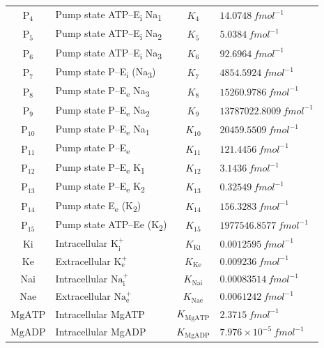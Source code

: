 \documentclass[fleqn,10pt]{physiome}
\begin{document}
\begin{table}[H]
\begin{tabular}{cl c l}
		$\text{P}_4$ & Pump state ATP--E\textsubscript{i} Na\textsubscript{1}
		 & $K_4$ & $14.0748\ \si{fmol^{-1}}$ \\ 
		$\text{P}_5$ & Pump state ATP--E\textsubscript{i} Na\textsubscript{2}
		 & $K_5$ & $5.0384\ \si{fmol^{-1}}$ \\ 
		$\text{P}_6$ & Pump state ATP--E\textsubscript{i} Na\textsubscript{3}
		 & $K_6$ & $92.6964\ \si{fmol^{-1}}$ \\ 
		$\text{P}_7$ & Pump state P--E\textsubscript{i} (Na\textsubscript{3})
		 & $K_7$ & $4854.5924\ \si{fmol^{-1}}$ \\ 
		$\text{P}_8$ & Pump state P--E\textsubscript{e} Na\textsubscript{3}
		 & $K_8$ & $15260.9786\ \si{fmol^{-1}}$ \\ 
		$\text{P}_9$ & Pump state P--E\textsubscript{e} Na\textsubscript{2}
		 & $K_9$ & $13787022.8009\ \si{fmol^{-1}}$ \\ 
		$\text{P}_{10}$ & Pump state P--E\textsubscript{e} Na\textsubscript{1}
		 & $K_{10}$ & $20459.5509\ \si{fmol^{-1}}$ \\ 
		$\text{P}_{11}$ & Pump state P--E\textsubscript{e}
		 & $K_{11}$ & $121.4456\ \si{fmol^{-1}}$ \\ 
		$\text{P}_{12}$ & Pump state P--E\textsubscript{e} K\textsubscript{1}
		 & $K_{12}$ & $3.1436\ \si{fmol^{-1}}$ \\ 
		$\text{P}_{13}$ & Pump state P--E\textsubscript{e} K\textsubscript{2}
		 & $K_{13}$ & $0.32549\ \si{fmol^{-1}}$ \\ 
		$\text{P}_{14}$ & Pump state E\textsubscript{e} (K\textsubscript{2})
		& $K_{14}$ & $156.3283\ \si{fmol^{-1}}$ \\ 
		$\text{P}_{15}$ & Pump state ATP--Ee (K\textsubscript{2})
		& $K_{15}$ & $1977546.8577\ \si{fmol^{-1}}$ \\ 
		Ki & Intracellular $\text{K}_\text{i}^+$ & $K_\text{Ki}$ & $0.0012595\ \si{fmol^{-1}}$ \\ 
		Ke & Extracellular $\text{K}_\text{e}^+$ & $K_\text{Ke}$ & $0.009236\ \si{fmol^{-1}}$ \\ 
		Nai & Intracellular $\text{Na}_\text{i}^+$ & $K_\text{Nai}$ & $0.00083514\ \si{fmol^{-1}}$ \\ 
		Nae & Extracellular $\text{Na}_\text{e}^+$ & $K_\text{Nae}$ & $0.0061242\ \si{fmol^{-1}}$ \\ 
		$\text{MgATP}$ & Intracellular MgATP & $K_\text{MgATP}$ & $2.3715\ \si{fmol^{-1}}$ \\ 
		$\text{MgADP}$ & Intracellular MgADP & $K_\text{MgADP}$ & $7.976 \times 10^{-5} \ \si{fmol^{-1}}$ \\ 

\end{tabular}
\end{table}
\end{document}
